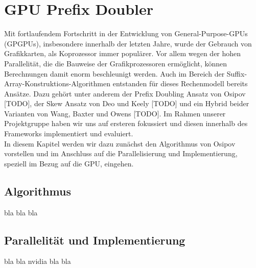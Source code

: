 \section{GPU Prefix Doubler}
\label{algorithm:gpuprefix}

Mit fortlaufendem Fortschritt in der Entwicklung von General-Purpose-GPUs (GPGPUs), insbesondere innerhalb der letzten Jahre, wurde der Gebrauch von Grafikkarten, als Koprozessor immer populärer. Vor allem wegen der hohen Parallelität, die die Bauweise der Grafikprozessoren ermöglicht, können Berechnungen damit enorm beschleunigt werden. Auch im Bereich der Suffix-Array-Konstruktions-Algorithmen entstanden für dieses Rechenmodell bereits Ansätze. Dazu gehört unter anderem der Prefix Doubling Ansatz von Osipov [TODO], der Skew Ansatz von Deo und Keely [TODO] und ein Hybrid beider Varianten von Wang, Baxter und Owens [TODO]. Im Rahmen unserer Projektgruppe haben wir uns auf ersteren fokussiert und diesen innerhalb des Frameworks implementiert und evaluiert.\\
In diesem Kapitel werden wir dazu zunächst den Algorithmus von Osipov vorstellen und im Anschluss auf die Parallelisierung und Implementierung, speziell im Bezug auf die GPU, eingehen.
\subsection{Algorithmus}
bla bla bla
\subsection{Parallelität und Implementierung}
bla bla nvidia bla bla